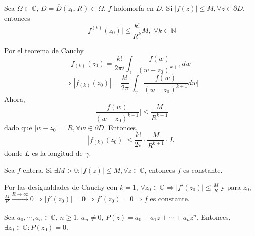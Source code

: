 \begin{theo}
  Sea $\Omega \subset \mathbb{C}$,  $D = \overline{D}(z_{0},R) \subset \Omega$, $f$ holomorfa en $D$. Si $| f(z) | \leq M, \forall z \in \partial{D}$, entonces
  \[ 
    \big | f^{(k)}(z_{0}) \big | \leq \frac{k!}{R^{k}}M, \; \forall k \in \mathbb{N}
  \] 
\end{theo}

\begin{dem}
  Por el teorema de Cauchy
  \[ 
    f_{(k)}(z_{0}) = \frac{k!}{2 \pi i} \int_{\gamma}^{} \frac{f(w)}{(w - z_{0})^{k+1}} dw 
  \] 
  \[ 
    \Rightarrow | f_{(k)}(z_{0}) | = \frac{k!}{2 \pi} \Big | \int_{\gamma}^{} \frac{f(w)}{(w - z_{0})^{k+1}} dw \Big |
  \] 
  Ahora,
  \[ 
    \Big | \frac{f(w)}{(w - z_{0})^{k+1}} \Big | \leq \frac{M}{R^{k+1}}
  \] 
  dado que $| w - z_{0} | = R, \forall w \in \partial D$. Entonces,
  \[ 
     | f_{(k)}(z_{0}) | \leq \frac{k!}{2 \pi} \cdot \frac{M}{R^{k+1}} \cdot L
  \] 
  donde $L$ es la longitud de $\gamma$.
\end{dem}

\begin{theo}[Liouville]
  Sea $f$ entera. Si $\exists M >0 : | f(z) |\leq M, \forall z \in \mathbb{C}$, entonces $f$ es constante.
\end{theo}

\begin{dem}
  Por las desigualdades de Cauchy con $k = 1$, $\forall z_{0} \in \mathbb{C} \Rightarrow | f'(z_{0}) | \leq \frac{M}{R}$ y para $z_{0}$, $\frac{M}{R} \xrightarrow[]{ R \rightarrow \infty } 0 \Rightarrow | f'(z_{0}) | = 0 \Rightarrow f'(z_{0}) = 0 \Rightarrow f$ es constante.
\end{dem}

\begin{theo}
  Sea $a_{0}, \cdots, a_{n} \in \mathbb{C}$, $n \geq 1$, $a_{n} \neq 0$, $P(z) = a_{0} + a_{1} z + \cdots + a_{n} z^{n}$. Entonces, $\exists z_{0} \in \mathbb{C}: P(z_{0}) = 0$.
\end{theo}

